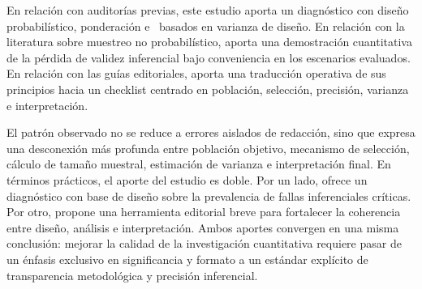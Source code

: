 En relación con auditorías previas, este estudio aporta un diagnóstico con diseño probabilístico, ponderación e \IC\ basados en varianza de diseño. En relación con la literatura sobre muestreo no probabilístico, aporta una demostración cuantitativa de la pérdida de validez inferencial bajo conveniencia en los escenarios evaluados. En relación con las guías editoriales, aporta una traducción operativa de sus principios hacia un checklist centrado en población, selección, precisión, varianza e interpretación.

El patrón observado no se reduce a errores aislados de redacción, sino que expresa una desconexión más profunda entre población objetivo, mecanismo de selección, cálculo de tamaño muestral, estimación de varianza e interpretación final. En términos prácticos, el aporte del estudio es doble. Por un lado, ofrece un diagnóstico con base de diseño sobre la prevalencia de fallas inferenciales críticas. Por otro, propone una herramienta editorial breve para fortalecer la coherencia entre diseño, análisis e interpretación. Ambos aportes convergen en una misma conclusión: mejorar la calidad de la investigación cuantitativa requiere pasar de un énfasis exclusivo en significancia y formato a un estándar explícito de transparencia metodológica y precisión inferencial.
